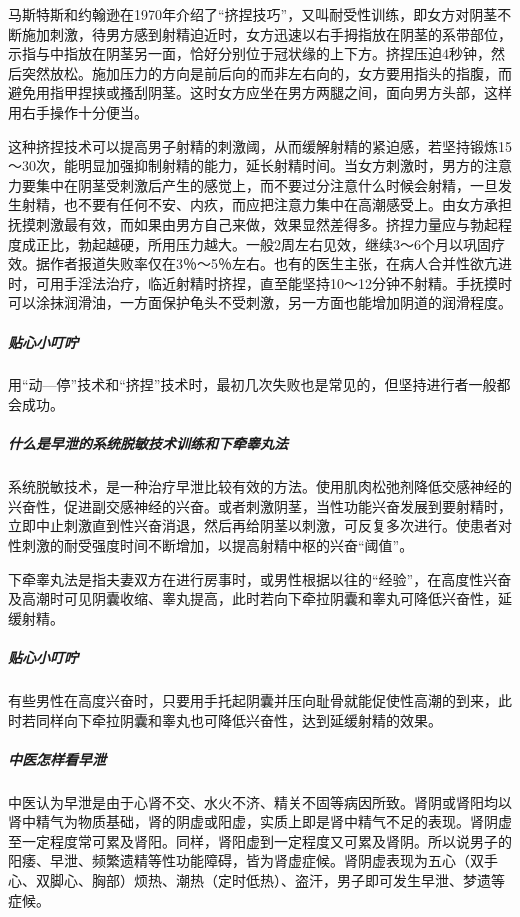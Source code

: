 \begin{enumerate}
马斯特斯和约翰逊在1970年介绍了“挤捏技巧”，又叫耐受性训练，即女方对阴茎不断施加刺激，待男方感到射精迫近时，女方迅速以右手拇指放在阴茎的系带部位，示指与中指放在阴茎另一面，恰好分别位于冠状缘的上下方。挤捏压迫4秒钟，然后突然放松。施加压力的方向是前后向的而非左右向的，女方要用指头的指腹，而避免用指甲捏挟或搔刮阴茎。这时女方应坐在男方两腿之间，面向男方头部，这样用右手操作十分便当。

这种挤捏技术可以提高男子射精的刺激阈，从而缓解射精的紧迫感，若坚持锻炼15～30次，能明显加强抑制射精的能力，延长射精时间。当女方刺激时，男方的注意力要集中在阴茎受刺激后产生的感觉上，而不要过分注意什么时候会射精，一旦发生射精，也不要有任何不安、内疚，而应把注意力集中在高潮感受上。由女方承担抚摸刺激最有效，而如果由男方自己来做，效果显然差得多。挤捏力量应与勃起程度成正比，勃起越硬，所用压力越大。一般2周左右见效，继续3～6个月以巩固疗效。据作者报道失败率仅在3％～5％左右。也有的医生主张，在病人合并性欲亢进时，可用手淫法治疗，临近射精时挤捏，直至能坚持10～12分钟不射精。手抚摸时可以涂抹润滑油，一方面保护龟头不受刺激，另一方面也能增加阴道的润滑程度。

\subparagraph{贴心小叮咛}

用“动—停”技术和“挤捏”技术时，最初几次失败也是常见的，但坚持进行者一般都会成功。

\subparagraph{什么是早泄的系统脱敏技术训练和下牵睾丸法}

系统脱敏技术，是一种治疗早泄比较有效的方法。使用肌肉松弛剂降低交感神经的兴奋性，促进副交感神经的兴奋。或者刺激阴茎，当性功能兴奋发展到要射精时，立即中止刺激直到性兴奋消退，然后再给阴茎以刺激，可反复多次进行。使患者对性刺激的耐受强度时间不断增加，以提高射精中枢的兴奋“阈值”。

下牵睾丸法是指夫妻双方在进行房事时，或男性根据以往的“经验”，在高度性兴奋及高潮时可见阴囊收缩、睾丸提高，此时若向下牵拉阴囊和睾丸可降低兴奋性，延缓射精。

\subparagraph{贴心小叮咛}

有些男性在高度兴奋时，只要用手托起阴囊并压向耻骨就能促使性高潮的到来，此时若同样向下牵拉阴囊和睾丸也可降低兴奋性，达到延缓射精的效果。

\subparagraph{中医怎样看早泄}

中医认为早泄是由于心肾不交、水火不济、精关不固等病因所致。肾阴或肾阳均以肾中精气为物质基础，肾的阴虚或阳虚，实质上即是肾中精气不足的表现。肾阴虚至一定程度常可累及肾阳。同样，肾阳虚到一定程度又可累及肾阴。所以说男子的阳痿、早泄、频繁遗精等性功能障碍，皆为肾虚症候。肾阴虚表现为五心（双手心、双脚心、胸部）烦热、潮热（定时低热）、盗汗，男子即可发生早泄、梦遗等症候。


\end{enumerate}
